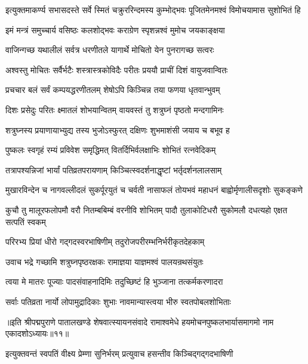 \twolineshloka
{इत्युक्तमाकर्ण्य सभासदस्ते सर्वे स्मितं चक्रुररिन्दमस्य}
{कुम्भोद्भवः पूजितमेनमश्वं विमोचयामास सुशोभितं हि}%

\twolineshloka
{इमं मन्त्रं समुच्चार्य वसिष्ठः कलशोद्भवः}
{कराग्रेण स्पृशन्नश्वं मुमोच जयकाङ्क्षया}%

\twolineshloka
{वाजिन्गच्छ यथालीलं सर्वत्र धरणीतले}
{यागार्थे मोचितो येन पुनरागच्छ सत्वरः}%

\twolineshloka
{अश्वस्तु मोचितः सर्वैर्भटैः शस्त्रास्त्रकोविदैः}
{परीतः प्रययौ प्राचीं दिशं वायुजवान्वितः}%

\twolineshloka
{प्रचचार बलं सर्वं कम्पयद्धरणीतलम्}
{शेषोऽपि किञ्चिन्न तया फणया धृतवान्भुवम्}%

\twolineshloka
{दिशः प्रसेदुः परितः क्ष्मातलं शोभयान्वितम्}
{वायवस्तं तु शत्रुघ्नं पृष्ठतो मन्दगामिनः}%

\twolineshloka
{शत्रुघ्नस्य प्रयाणायाभ्युद्य तस्य भुजोऽस्फुरत्}
{दक्षिणः शुभमाशंसी जयाय च बभूव ह}%

\twolineshloka
{पुष्कलः स्वगृहं रम्यं प्रविवेश समृद्धिमत्}
{वितर्दिभिर्वलक्षाभिः शोभितं रत्नवेदिकम्}%

\twolineshloka
{तत्रापश्यन्निजां भार्यां पतिव्रतपरायणाम्}
{किञ्चित्स्वदर्शनाद्धृष्टां भर्तृदर्शनलालसाम्}%

\twolineshloka
{मुखारविन्देन च नागवल्लीदलं सुकर्पूरयुतं च चर्वती}
{नासाफलं तोयभवं महाधनं बाह्वोर्मृणालीसदृशोः सुकङ्कणे}%

\twolineshloka
{कुचौ तु मालूरफलोपमौ वरौ नितम्बबिम्बं वरनीवि शोभितम्}
{पादौ तुलाकोटिधरौ सुकोमलौ दधत्यहो एक्षत सत्पतिं स्वकम्}%

\twolineshloka
{परिरभ्य प्रियां धीरो गद्गदस्वरभाषिणीम्}
{तदुरोजपरीरम्भनिर्भरीकृतदेहकाम्}%

\twolineshloka
{उवाच भद्रे गच्छामि शत्रुघ्नपृष्ठरक्षकः}
{रामाज्ञया याज्ञमश्वं पालयन्रथसंयुतः}%

\twolineshloka
{त्वया मे मातरः पूज्याः पादसंवाहनादिमिः}
{तदुच्छिष्टं हि भुञ्जाना तत्कर्मकरणादरा}%

\twolineshloka
{सर्वाः पतिव्रता नार्यो लोपामुद्रादिकाः शुभाः}
{नावमान्यास्त्वया भीरु स्वतपोबलशोभिताः}%

{॥इति श्रीपद्मपुराणे पातालखण्डे शेषवात्स्यायनसंवादे रामाश्वमेधे हयमोचनपुष्कलभार्यासमागमो नाम एकादशोऽध्यायः॥११॥}



\twolineshloka
{इत्युक्तवन्तं स्वपतिं वीक्ष्य प्रेम्णा सुनिर्भरम्}
{प्रत्युवाच हसन्तीव किञ्चिद्गद्गदभाषिणी}%

